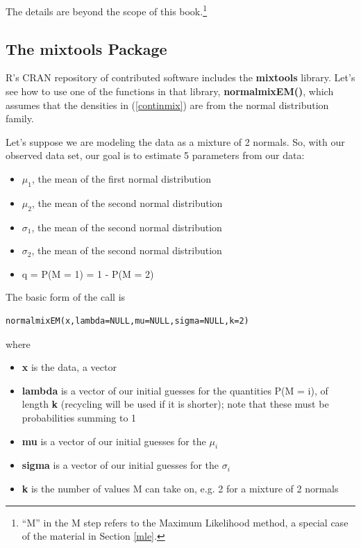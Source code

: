\documentclass[11pt]{article}
\begin{document}
The details are beyond the scope of this book.\footnote{``M'' in the M
step refers to the Maximum Likelihood method, a special case of the
material in Section \ref{mle}.}


\subsection{The mixtools Package}

R's CRAN repository of contributed software includes the {\bf mixtools}
library.  Let's see how to use one of the functions in that library,
{\bf normalmixEM()}, which assumes that the densities in
(\ref{continmix}) are from the normal distribution family.

Let's suppose we are modeling the data as a mixture of 2 normals.
So, with our observed data set, our goal is to estimate 5 parameters
from our data:  

\begin{itemize}

\item $\mu_1$, the mean of the first normal distribution 

\item $\mu_2$, the mean of the second normal distribution 

\item $\sigma_1$, the mean of the second normal distribution 

\item $\sigma_2$, the mean of the second normal distribution 

\item q = P(M = 1) = 1 - P(M = 2)

\end{itemize}

The basic form of the call is 

\begin{lstlisting}
normalmixEM(x,lambda=NULL,mu=NULL,sigma=NULL,k=2)
\end{lstlisting}

where

\begin{itemize}

\item {\bf x} is the data, a vector

\item {\bf lambda} is a vector of our initial guesses for the quantities
P(M = i), of length {\bf k} (recycling will be used if it is shorter);
note that these must be probabilities summing to 1

\item {\bf mu} is a vector of our initial guesses for the $\mu_i$

\item {\bf sigma} is a vector of our initial guesses for the $\sigma_i$

\item {\bf k} is the number of values M can take on, e.g. 2 for a
mixture of 2 normals

\end{itemize}
\end{document}
